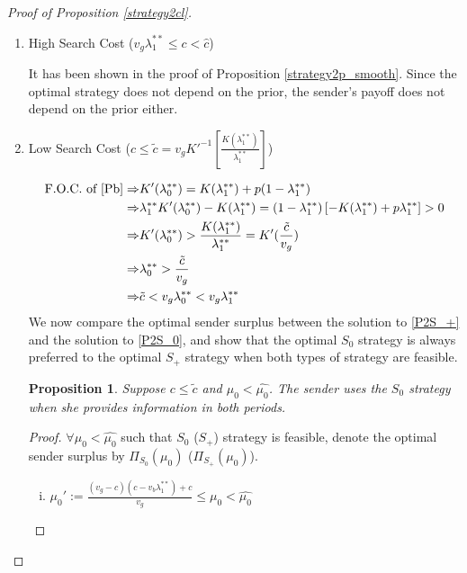 \documentclass[11pt]{extarticle}
\newtheorem{proposition}{Proposition}
\newcommand{\ra}{\Rightarrow}
\begin{document}
\begin{proof}[Proof of Proposition \ref{strategy2cl}]
	
	~
	\begin{enumerate}[(1)]
		\item High Search Cost ($v_g \lambda_1^{**} \leq c < \widehat{c}$)
		
		It has been shown in the proof of Proposition \ref{strategy2p_smooth}. Since the optimal strategy does not depend on the prior, the sender's payoff does not depend on the prior either.
		
		\item Low Search Cost ($c \leq \tilde{c} = v_g K'^{-1}\left[\frac{K(\lambda_1^{**})}{\lambda_1^{**}}\right]$)
		
		\vspace{-25pt}
		\begin{align*}
		\text{F.O.C. of \eqref{Pb}} \ra& K'(\lambda_0^{**}) = K(\lambda_1^{**}) + p(1-\lambda_1^{**})\\
		\ra & \lambda_1^{**} K'(\lambda_0^{**}) - K(\lambda_1^{**}) =(1-\lambda_1^{**})\left[ -K(\lambda_1^{**})+p\lambda_1^{**}\right] > 0\\
		\ra& K'(\lambda_0^{**}) > \frac{K(\lambda_1^{**})}{\lambda_1^{**}} = K'(\frac{\tilde{c}}{v_g})\\
		\ra&\lambda_0^{**} > \frac{\tilde{c}}{v_g}\\
		\ra& \tilde{c} < v_g\lambda_0^{**} < v_g\lambda_1^{**}
		\end{align*}
		We now compare the optimal sender surplus between the solution to \eqref{P2S_+} and the solution to \eqref{P2S_0}, and show that the optimal $S_0$ strategy is always preferred to the optimal $S_+$ strategy when both types of strategy are feasible. 
		\begin{proposition}\label{comparisonS_+S_0}
			Suppose $c \leq \tilde{c}$ and $\mu_0 < \widehat{\mu_0}$. The sender uses the $S_0$ strategy when she provides information in both periods. 
		\end{proposition}
		\begin{proof}
			$\forall \mu_0 < \widehat{\mu_0}$ such that $S_0$ ($S_+$) strategy is feasible, denote the optimal sender surplus by $\Pi_{S_0}(\mu_0)$ ($\Pi_{S_+}(\mu_0)$).
			
			\begin{enumerate}[i)]
				\item $\mu_0' := \frac{(v_g-c)(c-v_b\lambda_1^{**})+c}{v_g}\leq \mu_0 < \widehat{\mu_0}$
				

\end{enumerate}
\end{proof}
\end{enumerate}
\end{proof}
\end{document}
